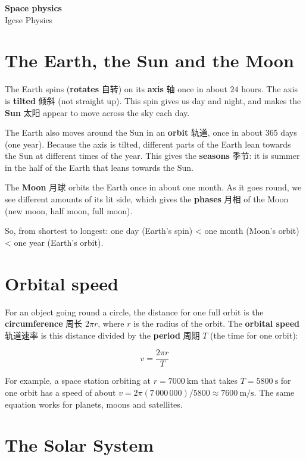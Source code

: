 \documentclass[11pt]{article}
\begin{document}
\begin{center}
  {\LARGE\bfseries Space physics}\\[0.35em]
  {\large Igcse Physics}
\end{center}
\vspace{0.6em}

\section*{The Earth, the Sun and the Moon}

The Earth spins (\textbf{rotates} 自转) on its \textbf{axis} 轴 once in about $24$ hours. The axis is \textbf{tilted} 倾斜 (not straight up). This spin gives us day and night, and makes the \textbf{Sun} 太阳 appear to move across the sky each day.

The Earth also moves around the Sun in an \textbf{orbit} 轨道, once in about $365$ days (one year). Because the axis is tilted, different parts of the Earth lean towards the Sun at different times of the year. This gives the \textbf{seasons} 季节: it is summer in the half of the Earth that leans towards the Sun.

The \textbf{Moon} 月球 orbits the Earth once in about one month. As it goes round, we see different amounts of its lit side, which gives the \textbf{phases} 月相 of the Moon (new moon, half moon, full moon).

So, from shortest to longest: one day (Earth's spin) \textless{} one month (Moon's orbit) \textless{} one year (Earth's orbit).

\section*{Orbital speed}

For an object going round a circle, the distance for one full orbit is the \textbf{circumference} 周长 $2\pi r$, where $r$ is the radius of the orbit. The \textbf{orbital speed} 轨道速率 is this distance divided by the \textbf{period} 周期 $T$ (the time for one orbit):

\[
v = \frac{2\pi r}{T}
\]

For example, a space station orbiting at $r = 7000\ \text{km}$ that takes $T = 5800\ \text{s}$ for one orbit has a speed of about $v = 2\pi(7\,000\,000)/5800 \approx 7600\ \text{m/s}$. The same equation works for planets, moons and satellites.

\section*{The Solar System}
\end{document}
